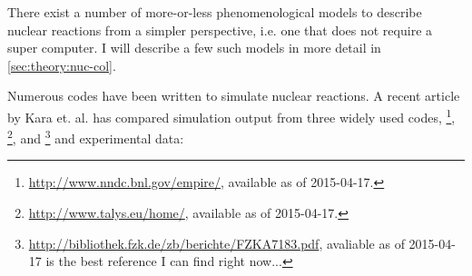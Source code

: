 There exist a number of more-or-less phenomenological models to describe nuclear reactions from a simpler perspective, i.e. one that does not require a super computer. I will describe a few such models in more detail in \autoref{sec:theory:nuc-col}. 

Numerous codes have been written to simulate nuclear reactions. A recent article by Kara et. al.\cite{kara:2015:art} has compared simulation output from three widely used codes, \footnote{\url{http://www.nndc.bnl.gov/empire/}, available as of 2015-04-17.}, \footnote{\url{http://www.talys.eu/home/}, available as of 2015-04-17.}, and \footnote{\url{http://bibliothek.fzk.de/zb/berichte/FZKA7183.pdf}, avaliable as of 2015-04-17 is the best reference I can find right now...} and experimental data: 



